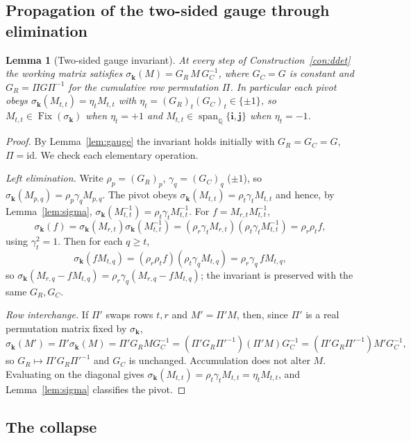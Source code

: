\documentclass[pdflatex,sn-mathphys-num]{sn-jnl}
\theoremstyle{thmstyleone}%
\newtheorem{lemma}[theorem]{Lemma}%
\theoremstyle{thmstyletwo}%
\theoremstyle{thmstylethree}%
\newcommand{\QQ}{\mathbb{Q}}
\newcommand{\Fix}{\operatorname{Fix}}
\newcommand{\bi}{\mathbf{i}}
\newcommand{\bj}{\mathbf{j}}
\newcommand{\bk}{\mathbf{k}}
\DeclareMathOperator{\spann}{span}
\begin{document}
\subsection{Propagation of the two-sided gauge through elimination}

\begin{lemma}[Two-sided gauge invariant]\label{lem:invariant}
At every step of Construction~\ref{con:ddet} the working matrix satisfies
$\sigma_{\bk}(M)=G_R\,M\,G_C^{-1}$, where $G_C=G$ is constant and
$G_R=\Pi G\Pi^{-1}$ for the cumulative row permutation $\Pi$. In particular
each pivot obeys $\sigma_{\bk}(M_{t,t})=\eta_t M_{t,t}$ with
$\eta_t=(G_R)_t(G_C)_t\in\{\pm1\}$, so $M_{t,t}\in\Fix(\sigma_{\bk})$ when
$\eta_t=+1$ and $M_{t,t}\in\spann_\QQ\{\bi,\bj\}$ when $\eta_t=-1$.
\end{lemma}

\begin{proof}
By Lemma~\ref{lem:gauge} the invariant holds initially with
$G_R=G_C=G$, $\Pi=\mathrm{id}$. We check each elementary operation.

\emph{Left elimination.} Write $\rho_p=(G_R)_p$, $\gamma_q=(G_C)_q$
($\pm1$), so $\sigma_{\bk}(M_{p,q})=\rho_p\gamma_q M_{p,q}$. The pivot obeys
$\sigma_{\bk}(M_{t,t})=\rho_t\gamma_t M_{t,t}$ and hence, by
Lemma~\ref{lem:sigma}, $\sigma_{\bk}(M_{t,t}^{-1})=\rho_t\gamma_t
M_{t,t}^{-1}$. For $f=M_{r,t}M_{t,t}^{-1}$,
\[
  \sigma_{\bk}(f)=\sigma_{\bk}(M_{r,t})\sigma_{\bk}(M_{t,t}^{-1})
  =(\rho_r\gamma_t M_{r,t})(\rho_t\gamma_t M_{t,t}^{-1})=\rho_r\rho_t f,
\]
using $\gamma_t^2=1$. Then for each $q\ge t$,
\[
  \sigma_{\bk}(fM_{t,q})=(\rho_r\rho_t f)(\rho_t\gamma_q M_{t,q})
  =\rho_r\gamma_q\, fM_{t,q},
\]
so $\sigma_{\bk}(M_{r,q}-fM_{t,q})=\rho_r\gamma_q(M_{r,q}-fM_{t,q})$; the
invariant is preserved with the same $G_R,G_C$.

\emph{Row interchange.} If $\Pi'$ swaps rows $t,r$ and $M'=\Pi'M$, then,
since $\Pi'$ is a real permutation matrix fixed by $\sigma_{\bk}$,
\[
  \sigma_{\bk}(M')=\Pi'\sigma_{\bk}(M)=\Pi'G_RMG_C^{-1}
  =(\Pi'G_R\Pi'^{-1})(\Pi'M)G_C^{-1}=(\Pi'G_R\Pi'^{-1})M'G_C^{-1},
\]
so $G_R\mapsto\Pi'G_R\Pi'^{-1}$ and $G_C$ is unchanged. Accumulation does
not alter $M$. Evaluating on the diagonal gives
$\sigma_{\bk}(M_{t,t})=\rho_t\gamma_t M_{t,t}=\eta_t M_{t,t}$, and
Lemma~\ref{lem:sigma} classifies the pivot.
\end{proof}

\subsection{The collapse}
\end{document}
